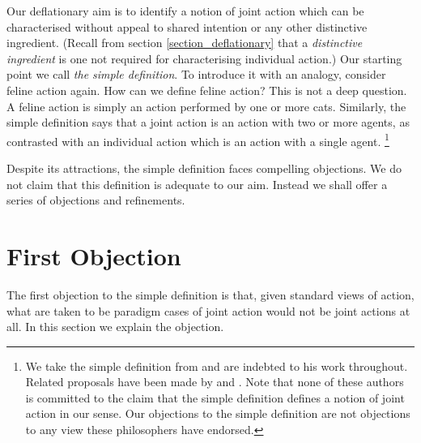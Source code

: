 \documentclass[12pt,a4paper]{extarticle}
\begin{document}
Our deflationary aim is to identify a notion of joint action which can be characterised without appeal to shared intention or any other distinctive ingredient.
(Recall from section \ref{section_deflationary} that a \emph{distinctive ingredient} is one not required for characterising individual action.)
Our starting point we call  \emph{the simple definition}.
To introduce it with an analogy, consider feline action again.
How can we define feline action?
This is not  a deep question.
A feline action is simply an action performed by one or more cats.
Similarly, the simple definition says that a {joint action} is an action with two or more agents, as contrasted with an {individual action} which is an action with a single agent.%
%
\footnote{
We take the simple definition from \citet[p.\ 366]{ludwig_collective_2007} and are indebted to his work throughout.
Related proposals have been made by \citet[p.\ 4]{smith_playing_2011} and \citet{chant_special_2006}.
Note that none of these authors is committed to the claim that the simple definition defines a notion of joint action in our sense.
Our objections to the simple definition are not objections to any view these philosophers have endorsed.
}

Despite its attractions, the simple definition faces compelling objections.
We do not claim that this definition is adequate to our aim.
Instead we shall offer a series of objections and refinements.

\label{end_section_simple_definition}


\section{First Objection}
	\label{section_first_objection}


The first objection to the simple definition is that, given standard views of action, what are taken to be paradigm cases of joint action would not be joint actions at all.
In this section we explain the objection.
\end{document}
